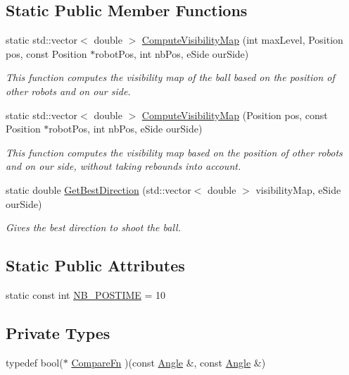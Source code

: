 \subsection*{Static Public Member Functions}
\begin{DoxyCompactItemize}
\item 
static std::vector$<$ double $>$ \hyperlink{classBallMonitor_a0d2ef73ba2b0573021c800c311e08245}{ComputeVisibilityMap} (int maxLevel, Position pos, const Position $\ast$robotPos, int nbPos, eSide ourSide)
\begin{DoxyCompactList}\small\item\em This function computes the visibility map of the ball based on the position of other robots and on our side. \item\end{DoxyCompactList}\item 
static std::vector$<$ double $>$ \hyperlink{classBallMonitor_a53e07299cf403dd036cab543d37fbf92}{ComputeVisibilityMap} (Position pos, const Position $\ast$robotPos, int nbPos, eSide ourSide)
\begin{DoxyCompactList}\small\item\em This function computes the visibility map based on the position of other robots and on our side, without taking rebounds into account. \item\end{DoxyCompactList}\item 
static double \hyperlink{classBallMonitor_a9045d5d3abf9c9b549303c831b3387e0}{GetBestDirection} (std::vector$<$ double $>$ visibilityMap, eSide ourSide)
\begin{DoxyCompactList}\small\item\em Gives the best direction to shoot the ball. \item\end{DoxyCompactList}\end{DoxyCompactItemize}
\subsection*{Static Public Attributes}
\begin{DoxyCompactItemize}
\item 
static const int \hyperlink{classBallMonitor_a6603291a8d6c6a2de7b378ece54d5e2b}{NB\_\-POSTIME} = 10
\end{DoxyCompactItemize}
\subsection*{Private Types}
\begin{DoxyCompactItemize}
\item 
typedef bool($\ast$ \hyperlink{classBallMonitor_a5ad781c99d5b43bee7c838de9da75527}{CompareFn} )(const \hyperlink{structBallMonitor_1_1Angle}{Angle} \&, const \hyperlink{structBallMonitor_1_1Angle}{Angle} \&)
\end{DoxyCompactItemize}
